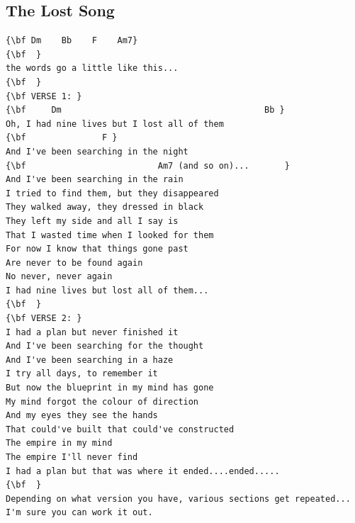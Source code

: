 \documentclass[a4paper]{article}
\begin{document}
\subsection{The Lost Song} %
\label{sub:The Lost Song}
\begin{Verbatim}[commandchars=\\\{\}]
{\bf Dm    Bb    F    Am7}
{\bf  }
the words go a little like this... 
{\bf  }
{\bf VERSE 1: }
{\bf     Dm                                        Bb }
Oh, I had nine lives but I lost all of them 
{\bf               F }
And I've been searching in the night  
{\bf                          Am7 (and so on)...       }
And I've been searching in the rain 
I tried to find them, but they disappeared 
They walked away, they dressed in black 
They left my side and all I say is 
That I wasted time when I looked for them 
For now I know that things gone past  
Are never to be found again 
No never, never again 
I had nine lives but lost all of them... 
{\bf  }
{\bf VERSE 2: }
I had a plan but never finished it 
And I've been searching for the thought 
And I've been searching in a haze  
I try all days, to remember it 
But now the blueprint in my mind has gone 
My mind forgot the colour of direction 
And my eyes they see the hands 
That could've built that could've constructed 
The empire in my mind 
The empire I'll never find 
I had a plan but that was where it ended....ended..... 
{\bf  }
Depending on what version you have, various sections get repeated...
I'm sure you can work it out.
\end{Verbatim}
\newpage
\end{document}
